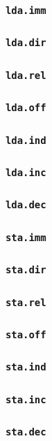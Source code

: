 \pagebreak
\subsubsection{\texttt{lda.imm}}
\subsubsection{\texttt{lda.dir}}
\subsubsection{\texttt{lda.rel}}
\subsubsection{\texttt{lda.off}}
\subsubsection{\texttt{lda.ind}}
\subsubsection{\texttt{lda.inc}}
\subsubsection{\texttt{lda.dec}}

\subsubsection{\texttt{sta.imm}}
\subsubsection{\texttt{sta.dir}}
\subsubsection{\texttt{sta.rel}}
\subsubsection{\texttt{sta.off}}
\subsubsection{\texttt{sta.ind}}
\subsubsection{\texttt{sta.inc}}
\subsubsection{\texttt{sta.dec}}

